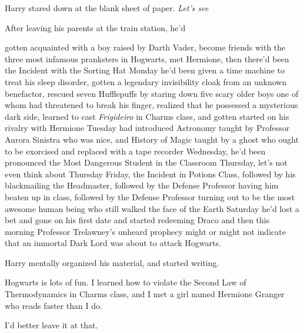 Harry stared down at the blank sheet of paper. \emph{Let's see{\el}}

After leaving his parents at the train station, he'd{\el}

{\el} gotten acquainted with a boy raised by Darth Vader, become friends with
the three most infamous pranksters in Hogwarts, met Hermione, then there'd been
the Incident with the Sorting Hat{\el} Monday he'd been given a time machine
to treat his sleep disorder, gotten a legendary invisibility cloak from an
unknown benefactor, rescued seven Hufflepuffs by staring down five scary older
boys one of whom had threatened to break his finger, realized that he possessed
a mysterious dark side, learned to cast \emph{Frigideiro} in Charms class, and
gotten started on his rivalry with Hermione{\el} Tuesday had introduced
Astronomy taught by Professor Aurora Sinistra who was nice, and History of
Magic taught by a ghost who ought to be exorcised and replaced with a tape
recorder{\el} Wednesday, he'd been pronounced the Most Dangerous Student in
the Classroom{\el} Thursday, let's not even think about Thursday{\el}
Friday, the Incident in Potions Class, followed by his blackmailing the
Headmaster, followed by the Defense Professor having him beaten up in class,
followed by the Defense Professor turning out to be the most awesome human
being who still walked the face of the Earth{\el} Saturday he'd lost a bet
and gone on his first date and started redeeming Draco{\el} and then this
morning Professor Trelawney's unheard prophecy might or might not indicate that
an immortal Dark Lord was about to attack Hogwarts.

Harry mentally organized his material, and started writing.

\begin{writtenNote}

Hogwarts is lots of fun. I learned how to violate the Second Law of
Thermodynamics in Charms class, and I met a girl named Hermione Granger who
reads faster than I do.

I'd better leave it at that.

\end{writtenNote}
